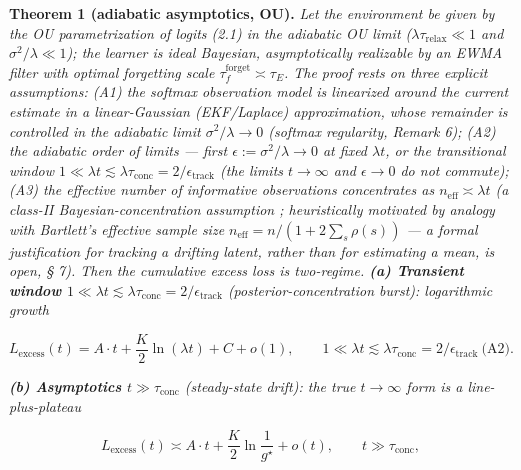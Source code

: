 \documentclass[12pt]{iopart}
\begin{document}
\textbf{Theorem 1 (adiabatic asymptotics, OU).} \emph{Let the environment be given by the OU parametrization of logits (2.1) in the adiabatic OU limit (\(\lambda\tau_{\text{relax}} \ll 1\) and \(\sigma^2/\lambda \ll 1\)); the learner is ideal Bayesian, asymptotically realizable by an EWMA filter with optimal forgetting scale \(\tau_f^{\text{forget}} \asymp \tau_E\). The proof rests on three explicit assumptions: (A1) the softmax observation model is linearized around the current estimate in a linear-Gaussian (EKF/Laplace) approximation, whose remainder is controlled in the adiabatic limit \(\sigma^2/\lambda \to 0\) (softmax regularity, \cite{Andriishin2026b} Remark 6); (A2) the adiabatic order of limits --- first \(\epsilon := \sigma^2/\lambda \to 0\) at fixed \(\lambda t\), or the transitional window \(1 \ll \lambda t \lesssim \lambda\tau_{\text{conc}} = 2/\epsilon_{\text{track}}\) (the limits \(t\to\infty\) and \(\epsilon\to 0\) do not commute); (A3) the effective number of informative observations concentrates as \(n_{\text{eff}} \asymp \lambda t\) (a class-II Bayesian-concentration assumption \cite{BialekNemenmanTishby2001}; \emph{heuristically motivated} by analogy with Bartlett's effective sample size \(n_{\text{eff}} = n/(1+2\sum_s\rho(s))\) \cite{Bartlett1946} --- a formal justification for \emph{tracking} a drifting latent, rather than for estimating a \emph{mean}, is open, § 7). Then the cumulative excess loss is two-regime. \textbf{(a) Transient window \(1\ll\lambda t\lesssim\lambda\tau_{\text{conc}} = 2/\epsilon_{\text{track}}\)} (posterior-concentration burst): logarithmic growth}



\begin{equation}L_{\text{excess}}(t) = A\cdot t + \frac{K}{2}\ln(\lambda t) + C + o(1), \qquad 1\ll\lambda t\lesssim\lambda\tau_{\text{conc}} = 2/\epsilon_{\text{track}}\ \text{(A2)}. \tag{3.1}\end{equation}



\emph{\textbf{(b) Asymptotics \(t\gg\tau_{\text{conc}}\)} (steady-state drift): the true \(t\to\infty\) form is a line-plus-plateau}



\begin{equation}L_{\text{excess}}(t) \asymp A\cdot t + \frac{K}{2}\ln\!\frac{1}{g^\star} + o(t), \qquad t\gg\tau_{\text{conc}}, \tag{3.1$'$}\end{equation}
\end{document}
